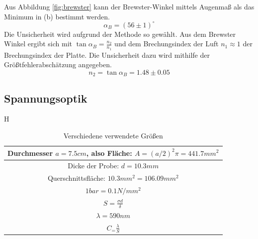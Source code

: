\documentclass[twoside]{article}
\begin{document}
Aus Abbildung \ref{fig:brewster} kann der Brewster-Winkel mittels Augenmaß als das Minimum in (b) bestimmt werden.
$$\boxed{\alpha_B=(56 \pm 1)^\circ}$$
Die Unsicherheit wird aufgrund der Methode so gewählt.
Aus dem Brewster Winkel ergibt sich mit $\tan \alpha_B=\frac{n_2}{n_1}$ und dem Brechungsindex der Luft $n_1 \approx 1$ der Brechungsindex der Platte. Die Unsicherheit dazu wird mithilfe der Größtfehlerabschätzung angegeben.
$$\boxed{n_2=\tan \alpha_B=1.48 \pm 0.05}$$



\subsection{Spannungsoptik}

\begin{table}H
\begin{center}
\begin{tabular}{|c|}
\hline Durchmesser $a=7.5cm$, also Fläche: $A=(a/2)^2\pi=441.7mm^2$\\
\hline
Dicke der Probe: $d=10.3mm$\\
\hline
Querschnittsfläche: $10.3mm^2=106.09mm^2$\\
\hline
$1 bar = 0.1 N/mm^2$\\
\hline
$S=\frac{\sigma d}{\delta}$\\
\hline
$\lambda=590nm$\\
\hline
$C_=\frac{\lambda}{S}$ \\
\hline
\end{tabular}
\end{center}
\caption{Verschiedene verwendete Größen}
\end{table}
\end{document}
